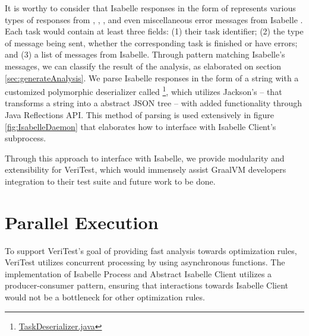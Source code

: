 It is worthy to consider that Isabelle responses in the form of  represents various types of responses from , 
, , and even miscellaneous error messages from Isabelle \cite[Sec. 4.4]{isabelleSystem}. 
Each task would contain at least three fields: (1) their task identifier; (2) the type of message being sent, whether the corresponding task 
is finished or have errors; and (3) a list of messages from Isabelle. Through pattern matching Isabelle's messages, we can classify the result 
of the analysis, as elaborated on section \ref{sec:generateAnalysis}. We parse 
Isabelle responses in the form of a string with a customized polymorphic deserializer called \footnote{\href{https://github.com/achmadafriza/veritest-dev/blob/master/src/main/java/com/veriopt/veritest/isabelle/TaskDeserializer.java}{TaskDeserializer.java}}, 
which utilizes Jackson's  \cite{fasterxml_objectmapper_nodate} -- that transforms a string into a abstract JSON tree -- 
with added functionality through Java Reflections API. This method of parsing is used extensively in figure \ref{fig:IsabelleDaemon} that 
elaborates how to interface with Isabelle Client's subprocess.

Through this approach to interface with Isabelle, we provide modularity and extensibility for VeriTest, which would immensely assist 
GraalVM developers integration to their test suite and future work to be done.

\section{Parallel Execution}
\label{sec:ParallelExecution}

To support VeriTest's goal of providing fast analysis towards optimization rules, VeriTest utilizes concurrent processing by using asynchronous 
functions. The implementation of Isabelle Process and Abstract Isabelle Client utilizes a producer-consumer pattern, ensuring 
that interactions towards Isabelle Client would not be a bottleneck for other optimization rules.


